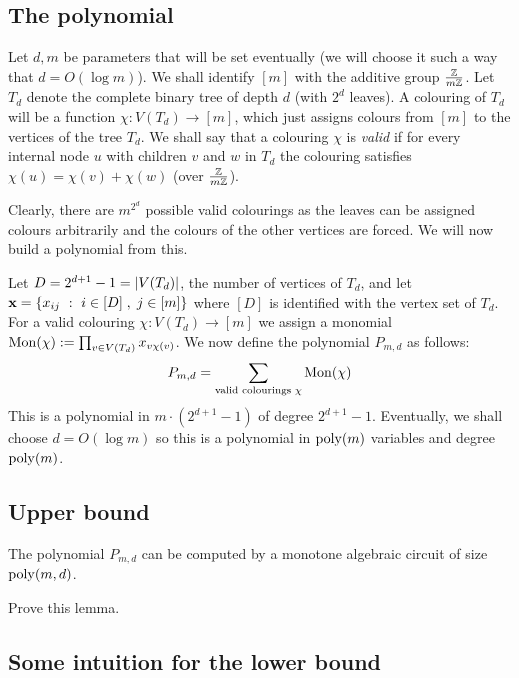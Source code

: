 \subsection{The polynomial}

Let $d,m$ be parameters that will be set eventually (we will choose it such a way that $d = O(\log m)$).
We shall identify $[m]$ with the additive group $\frac{\mathbb{Z}}{m\mathbb{Z}}$. Let $T_d$ denote the complete binary tree of depth $d$ (with $2^d$ leaves). A colouring of $T_d$ will be a function $\chi:V(T_d) \rightarrow [m]$, which just assigns colours from $[m]$ to the vertices of the tree $T_d$. We shall say that a colouring $\chi$ is \emph{valid} if for every internal node $u$ with children $v$ and $w$ in $T_d$ the colouring satisfies $\chi(u) = \chi(v) + \chi(w)$ (over $\frac{\mathbb{Z}}{m\mathbb{Z}}$).

Clearly, there are $m^{2^d}$ possible valid colourings as the leaves can be assigned colours arbitrarily and the colours of the other vertices are forced. We will now build a polynomial from this.

Let $D = 2^{d+1}-1= \left|V(T_d)\right|$, the number of vertices of $T_d$, and let $\mathbf{x} = \left\{{x_{ij}}\ : \ {i\in [D]\;,\;j\in [m]}\right\}$ where $[D]$ is identified with the vertex set of $T_d$.
For a valid colouring $\chi:V(T_d)\rightarrow [m]$ we  assign a monomial $\operatorname{Mon}(\chi) := \prod_{v\in V(T_d)} x_{v\chi(v)}$. We now define the polynomial $P_{m,d}$ as follows:
\[
  P_{m,d} = \sum_{\text{valid colourings } \chi} \operatorname{Mon}(\chi)
\]
This is a polynomial in $m \cdot (2^{d+1} - 1)$ of degree $2^{d+1}-1$. Eventually, we shall choose $d = O(\log m)$ so this is a polynomial in $\operatorname{poly}(m)$ variables and degree $\operatorname{poly}(m)$.

\subsection*{Upper bound}

\begin{lemma}\label{lem:MonSep-upper-bound}
  The polynomial $P_{m,d}$ can be computed by a monotone algebraic circuit of size $\operatorname{poly}(m,d)$.
\end{lemma}

\begin{exercise}
  Prove this lemma.
\end{exercise}

\subsection{Some intuition for the lower bound}

